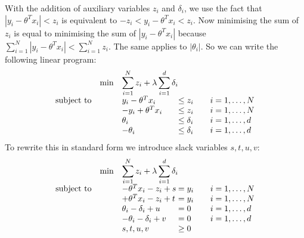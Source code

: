 \documentclass[10pt]{article}
\newenvironment{exercise}[2][Exercise]{\begin{trivlist}
  \item[\hskip \labelsep {\bfseries #1}\hskip \labelsep {\bfseries #2.}]}{\end{trivlist}}
\begin{document}
\begin{exercise}{2}
With the addition of auxiliary variables $z_i$ and $\delta_i$, we use the fact that $|y_i - \theta^T x_i| < z_i$ is equivalent to $-z_i < y_i - \theta^T x_i  < z_i$. Now minimising the sum of $z_i$ is equal to minimising the sum of $ |y_i-\theta^Tx_i|$ because $\sum\limits_{i=1}^{N}  |y_i-\theta^Tx_i| < \sum\limits_{i=1}^{N} z_i$. The same applies to $|\theta_i|$. So we can write the following linear program:
\begin{equation*}
\begin{array}{lll@{}lll}
&\text{min}  &\displaystyle\sum\limits_{i=1}^{N}z_i +  \lambda\sum\limits_{i=1}^{d}\delta_i &\\
\text{subject to} 
&& y_i-\theta^Tx_i &\leq z_i && i=1 ,\dots, N \\
&& -y_i+\theta^Tx_i &\leq z_i && i=1 ,\dots, N \\
                 && \theta_i &\leq \delta_i &&  i=1 ,\dots, d \\
                && -\theta_i &\leq \delta_i &&  i=1 ,\dots, d 
\end{array}
\end{equation*}
To rewrite this in standard form we introduce slack variables $s,t,u,v$: 
\begin{equation*}
\begin{array}{lll@{}lll}
&\text{min}  &\displaystyle\sum\limits_{i=1}^{N}z_i +  \lambda\sum\limits_{i=1}^{d}\delta_i &\\
\text{subject to} 
&& -\theta^Tx_i - z_i + s &= y_i && i=1 ,\dots, N \\
&& +\theta^Tx_i -z_i + t &= y_i && i=1 ,\dots, N \\
                 && \theta_i - \delta_i + u&= 0  &&  i=1 ,\dots, d \\
                && -\theta_i - \delta_i + v &= 0  &&  i=1 ,\dots, d 
                \\
                && s,t,u,v &\geq 0  && 
\end{array}
\end{equation*}



\end{exercise}
\end{document}
